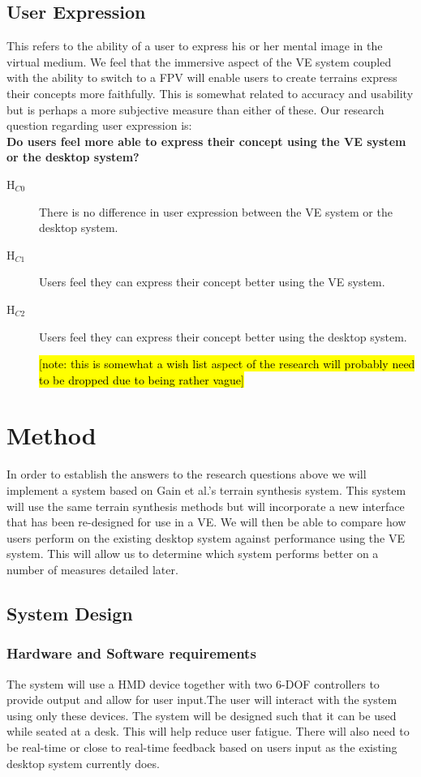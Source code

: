 \documentclass{sig-alternate-05-2015}
\begin{document}
\subsection{User Expression}
This refers to the ability of a user to express his or her mental image in the virtual medium. We feel that the immersive aspect of the VE system coupled with the ability to switch to a FPV will enable users to create terrains express their concepts more faithfully. This is somewhat related to accuracy and usability but is perhaps a more subjective measure than either of these. Our research question regarding user expression is: \\
\textbf{Do users feel more able to express their concept using the VE system or the desktop system?}\\
\begin{description}
	\item [H$_{C0}$] There is no difference in user expression between the VE system or the desktop system.
	\item [H$_{C1}$] Users feel they can express their concept better using the VE system.
	\item [H$_{C2}$] Users feel they can express their concept better using the desktop system.
	
\hl{[note: this is somewhat a wish list aspect of the research will probably need to be dropped due to being rather vague]}
\end{description}
\section{Method}
In order to establish the answers to the research questions above we will implement a system based on Gain et al.'s terrain synthesis system\cite{Gain2015}. This system will use the same terrain synthesis methods but will incorporate a new interface that has been re-designed for use in a VE. We will then be able to compare how users perform on the existing desktop system against performance using the VE system. This will allow us to determine which system performs better on a number of measures detailed later.
\subsection{System Design}
\subsubsection{Hardware and Software requirements}
The system will use a HMD device together with two 6-DOF controllers to provide output and allow for user input.The user will interact with the system using only these devices. The system will be designed such that it can be used while seated at a desk. This will help reduce user fatigue\cite{Schultheis2012}. There will also need to be real-time or close to real-time feedback based on users input as the existing desktop system currently does.
\end{document}
